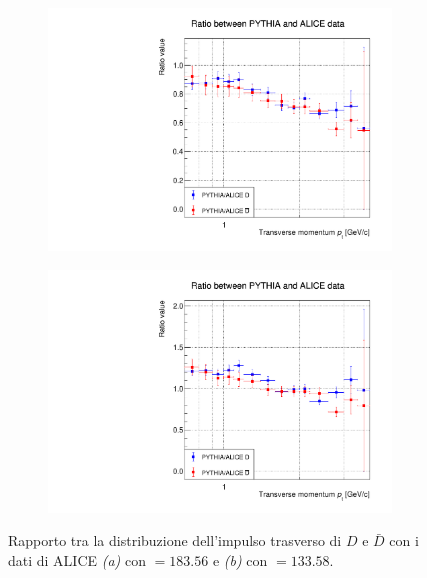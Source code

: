 \begin{figure}[h]
    \centering
    \begin{subfigure}{.49\textwidth}
    \centering
        \includegraphics[width=\textwidth]{image/3-risultati/analyse/B/division.pdf}
        \caption{}
        \label{fig:B_division}
    \end{subfigure}
    \begin{subfigure}{.49\textwidth}
        \centering
        \includegraphics[width=\textwidth]{image/3-risultati/analyse/F/division.pdf}
        \caption{}
        \label{fig:F_division}
    \end{subfigure}
    \caption{Rapporto tra la distribuzione dell'impulso trasverso di $D$ e $\bar D$ con i dati di ALICE \emph{\rmfamily (a)} con \emph{}$=183.56$ e \emph{\rmfamily (b)} con \emph{}$=133.58$.}
    \label{fig:ratio_pp_ON_OFF_BF}
\end{figure}
